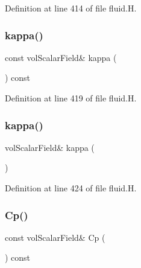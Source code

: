 Definition at line 414 of file fluid.\+H.

\mbox{\label{classFoam_1_1fluid_a9558b66566a0057d6b458ba953f0d291}} 
\subsubsection{\texorpdfstring{kappa()}{kappa()}\hspace{0.1cm}{\footnotesize\ttfamily [1/2]}}
{\footnotesize\ttfamily const vol\+Scalar\+Field\& kappa (\begin{DoxyParamCaption}{ }\end{DoxyParamCaption}) const\hspace{0.3cm}{\ttfamily [inline]}}



Definition at line 419 of file fluid.\+H.

\mbox{\label{classFoam_1_1fluid_a09ccc2ba084b5c803005abe3d99717f3}} 
\subsubsection{\texorpdfstring{kappa()}{kappa()}\hspace{0.1cm}{\footnotesize\ttfamily [2/2]}}
{\footnotesize\ttfamily vol\+Scalar\+Field\& kappa (\begin{DoxyParamCaption}{ }\end{DoxyParamCaption})\hspace{0.3cm}{\ttfamily [inline]}}



Definition at line 424 of file fluid.\+H.

\mbox{\label{classFoam_1_1fluid_a8b8817caced37fe24d98676072299b12}} 
\subsubsection{\texorpdfstring{Cp()}{Cp()}\hspace{0.1cm}{\footnotesize\ttfamily [1/2]}}
{\footnotesize\ttfamily const vol\+Scalar\+Field\& Cp (\begin{DoxyParamCaption}{ }\end{DoxyParamCaption}) const\hspace{0.3cm}{\ttfamily [inline]}}



